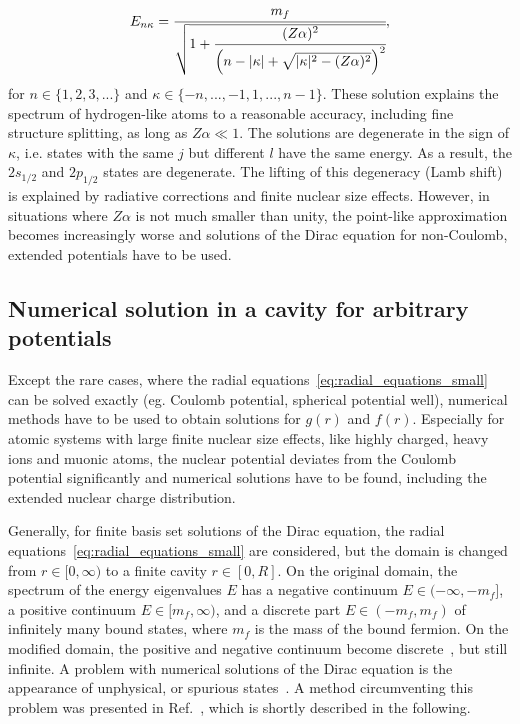 \begin{equation}
\label{eq:finestructure_formula}
E_{n\kappa}=\cfrac{m_f}{\sqrt{1+\cfrac{(Z\alpha)^2}{\left( n-|\kappa|+\sqrt{|\kappa|^2-(Z\alpha)^2} \right)^2}}},
\end{equation}
for $n\in \{1,2,3,...\}$ and $\kappa \in \{{-}{n},...,-1,1,...,n-1\}$.
These solution explains the spectrum of hydrogen-like atoms to a reasonable accuracy, including fine structure splitting, as long as $Z\alpha\ll 1$. The solutions are degenerate in the sign of $\kappa$, i.e. states with the same $j$ but different $l$ have the same energy. As a result, the $2s_{1/2}$ and $2p_{1/2}$ states are degenerate. The lifting of this degeneracy (Lamb shift) is explained by radiative corrections and finite nuclear size effects. However, in situations where $Z\alpha$ is not much smaller than unity, the point-like approximation becomes increasingly worse and solutions of the Dirac equation for non-Coulomb, extended potentials have to be used.



\subsection{Numerical solution in a cavity for arbitrary potentials}
Except the rare cases, where the radial equations~\eqref{eq:radial_equations_small} can be solved exactly (eg. Coulomb potential, spherical potential well), numerical methods have to be used to obtain solutions for $g(r)$ and $f(r)$. Especially for atomic systems with large finite nuclear size effects, like highly charged, heavy ions and muonic atoms, the nuclear potential deviates from the Coulomb potential significantly and numerical solutions have to be found, including the extended nuclear charge distribution.
 
Generally, for finite basis set solutions of the Dirac equation, the radial equations~\eqref{eq:radial_equations_small} are considered, but the domain is changed from $r\in[0,\infty)$ to a finite cavity $r\in [0,R]$. On the original domain, the spectrum of the energy eigenvalues $E$ has a negative continuum $E\in (-\infty,-m_f]$, a positive continuum $E\in [m_f,\infty)$, and a discrete part $E\in (-m_f,m_f)$ of infinitely many bound states, where $m_f$ is the mass of the bound fermion. On the modified domain, the positive and negative continuum become discrete~\cite{johnson1988}, but still infinite.
A problem with numerical solutions of the Dirac equation is the appearance of unphysical, or spurious states~\cite{johnson1988, drake1981}. A method circumventing this problem was presented in Ref.~\cite{Shabaev2004}, which is shortly described in the following.

